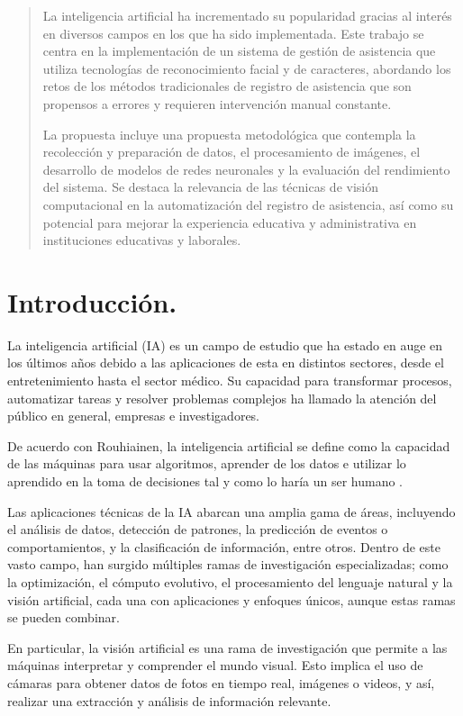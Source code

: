 \documentclass[12pt, letterpaper]{article}
\begin{document}
\renewcommand{\abstractname}{Resumen}
\begin{abstract}
La inteligencia artificial ha incrementado su popularidad gracias al interés en diversos campos en los que ha sido implementada. Este trabajo se centra en la implementación de un sistema de gestión de asistencia que utiliza tecnologías de reconocimiento facial y de caracteres, abordando los retos de los métodos tradicionales de registro de asistencia que son propensos a errores y requieren intervención manual constante.

La propuesta incluye una propuesta metodológica que contempla la recolección y preparación de datos, el procesamiento de imágenes, el desarrollo de modelos de redes neuronales y la evaluación del rendimiento del sistema. Se destaca la relevancia de las técnicas de visión computacional en la automatización del registro de asistencia, así como su potencial para mejorar la experiencia educativa y administrativa en instituciones educativas y laborales.
\end{abstract}




\section{Introducción.}
La inteligencia artificial (IA) es un campo de estudio que ha estado en auge en los últimos años debido a las aplicaciones de esta en distintos sectores, desde el entretenimiento hasta el sector médico. Su capacidad para transformar procesos, automatizar tareas y resolver problemas complejos ha llamado la atención del público en general, empresas e investigadores.

De acuerdo con Rouhiainen, la inteligencia artificial se define como la capacidad de las máquinas para usar algoritmos, aprender de los datos e utilizar lo aprendido en la toma de decisiones tal y como lo haría un ser humano \cite{b2}.

Las aplicaciones técnicas de la IA abarcan una amplia gama de áreas, incluyendo el análisis de datos, detección de patrones, la predicción de eventos o comportamientos, y la clasificación de información, entre otros. Dentro de este vasto campo, han surgido múltiples ramas de investigación especializadas; como la optimización, el cómputo evolutivo, el procesamiento del lenguaje natural y la visión artificial, cada una con aplicaciones y enfoques únicos, aunque estas ramas se pueden combinar.

En particular, la visión artificial es una rama de investigación que permite a las máquinas interpretar y comprender el mundo visual. Esto implica el uso de cámaras para obtener datos de fotos en tiempo real, imágenes o videos, y así, realizar una extracción y análisis de información relevante. 
\end{document}
